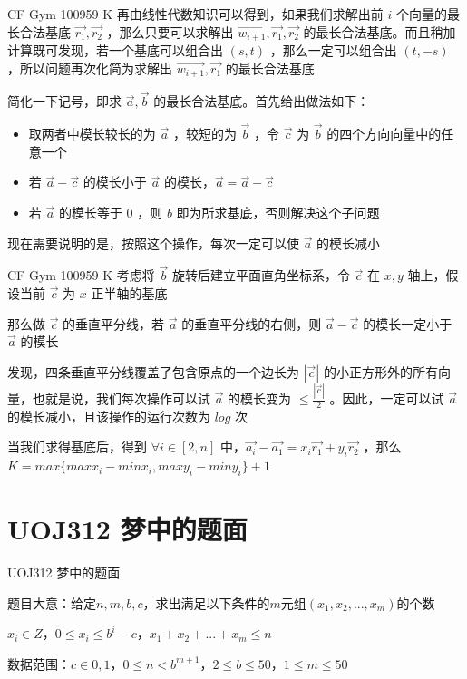 \documentclass[9pt]{beamer}
\begin{document}
  \begin{frame}{CF Gym 100959 K}
     再由线性代数知识可以得到，如果我们求解出前 $i$ 个向量的最长合法基底 $\vec{r_1},\vec{r_2}$ ，那么只要可以求解出 $\vec{w_{i+1}},\vec{r_1},\vec{r_2}$ 的最长合法基底。而且稍加计算既可发现，若一个基底可以组合出 $(s,t)$ ，那么一定可以组合出 $(t,-s)$ ，所以问题再次化简为求解出 $\vec{w_{i+1}},\vec{r_1}$ 的最长合法基底

     简化一下记号，即求 $\vec{a},\vec{b}$ 的最长合法基底。首先给出做法如下：

    \begin{itemize}
      \item 取两者中模长较长的为 $\vec{a}$ ，较短的为 $\vec{b}$ ，令 $\vec{c}$ 为 $\vec{b}$ 的四个方向向量中的任意一个
      \item 若 $\vec{a}-\vec{c}$ 的模长小于 $\vec{a}$ 的模长，$\vec{a}=\vec{a}-\vec{c}$
      \item 若 $\vec{a}$ 的模长等于 $0$ ，则 $b$ 即为所求基底，否则解决这个子问题
    \end{itemize}

     现在需要说明的是，按照这个操作，每次一定可以使 $\vec{a}$ 的模长减小
  \end{frame}

  \begin{frame}{CF Gym 100959 K}
     考虑将 $\vec{b}$ 旋转后建立平面直角坐标系，令 $\vec{c}$ 在 $x,y$ 轴上，假设当前 $\vec{c}$ 为 $x$ 正半轴的基底

     那么做 $\vec{c}$ 的垂直平分线，若 $\vec{a}$ 的垂直平分线的右侧，则 $\vec{a}-\vec{c}$ 的模长一定小于 $\vec{a}$ 的模长

     发现，四条垂直平分线覆盖了包含原点的一个边长为 $|\vec{c}|$ 的小正方形外的所有向量，也就是说，我们每次操作可以试 $\vec{a}$ 的模长变为 $\leq \frac{|\vec{c}|}{2}$ 。因此，一定可以试 $\vec{a}$ 的模长减小，且该操作的运行次数为 $log$ 次

     当我们求得基底后，得到 $\forall i\in[2,n]$ 中，$\vec{a_i}-\vec{a_1}=x_i\vec{r_1}+y_i\vec{r_2}$ ，那么 $K=max\{maxx_i-minx_i,maxy_i-miny_i\}+1$ 
  \end{frame}

  \section{UOJ312 梦中的题面}
  \begin{frame}{UOJ312 梦中的题面}
    \par 题目大意：给定$n,m,b,c$，求出满足以下条件的$m$元组$(x_1,x_2,...,x_m)$的个数
    \par $x_i \in Z$，$0\leqslant x_i \leqslant b^{i}-c$，$x_1+x_2+...+x_m \leqslant n$
    \par 数据范围：$c\in{0,1}$，$0\leqslant n < b^{m+1}$，$2 \leqslant b \leqslant 50$，$1 \leqslant m \leqslant 50$
  \end{frame}
  
\end{document}
